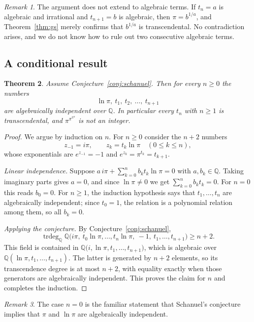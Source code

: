 \documentclass[11pt]{amsart}
\newtheorem{theorem}{Theorem}[section]
\theoremstyle{definition}
\theoremstyle{remark}
\newtheorem{remark}[theorem]{Remark}
\newcommand{\Q}{\mathbb{Q}}
\DeclareMathOperator{\trdeg}{trdeg}
\begin{document}
\begin{remark}
The argument does not extend to algebraic terms. If $t_n = a$ is algebraic and irrational and $t_{n+1} = b$ is algebraic, then $\pi = b^{1/a}$, and Theorem~\ref{thm:gs} merely confirms that $b^{1/a}$ is transcendental. No contradiction arises, and we do not know how to rule out two consecutive algebraic terms.
\end{remark}

\subsection{A conditional result}

\begin{theorem}\label{thm:schanuel-tower}
Assume Conjecture~\ref{conj:schanuel}. Then for every $n \ge 0$ the numbers
\[
\ln \pi,\ t_1,\ t_2,\ \ldots,\ t_{n+1}
\]
are algebraically independent over $\Q$. In particular every $t_n$ with $n\ge1$ is transcendental, and $\pi^{\pi^{\pi^{\pi}}}$ is not an integer.
\end{theorem}

\begin{proof}
We argue by induction on $n$. For $n \ge 0$ consider the $n+2$ numbers
\[
z_{-1} = i\pi, \qquad z_k = t_k \ln\pi \quad (0 \le k \le n),
\]
whose exponentials are $e^{z_{-1}} = -1$ and $e^{z_k} = \pi^{t_k} = t_{k+1}$.

\emph{Linear independence.} Suppose $a\, i\pi + \sum_{k=0}^{n} b_k t_k \ln \pi = 0$ with $a, b_k \in \Q$. Taking imaginary parts gives $a = 0$, and since $\ln\pi \neq 0$ we get $\sum_{k=0}^{n} b_k t_k = 0$. For $n = 0$ this reads $b_0 = 0$. For $n \ge 1$, the induction hypothesis says that $t_1, \ldots, t_n$ are algebraically independent; since $t_0 = 1$, the relation is a polynomial relation among them, so all $b_k = 0$.

\emph{Applying the conjecture.} By Conjecture~\ref{conj:schanuel},
\[
\trdeg_{\Q} \Q\bigl(i\pi,\ t_0\ln\pi, \ldots, t_n\ln\pi,\ -1,\ t_1, \ldots, t_{n+1}\bigr) \ge n+2.
\]
This field is contained in $\Q\bigl(i, \ln\pi, t_1, \ldots, t_{n+1}\bigr)$, which is algebraic over $\Q(\ln\pi, t_1, \ldots, t_{n+1})$. The latter is generated by $n+2$ elements, so its transcendence degree is at most $n+2$, with equality exactly when those generators are algebraically independent. This proves the claim for $n$ and completes the induction.
\end{proof}

\begin{remark}
The case $n = 0$ is the familiar statement that Schanuel's conjecture implies that $\pi$ and $\ln \pi$ are algebraically independent.
\end{remark}
\end{document}
